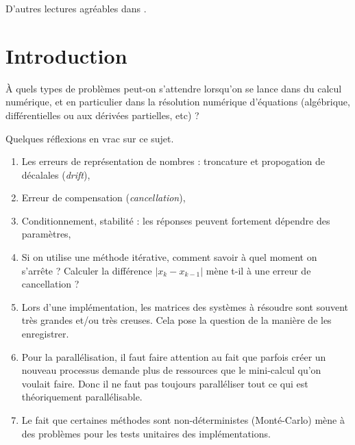 
D'autres lectures agréables dans \cite{GianlucaB}.

\section{Introduction}

À quels types de problèmes peut-on s'attendre lorsqu'on se lance dans du calcul numérique, et en particulier dans la résolution numérique d'équations (algébrique, différentielles ou aux dérivées partielles, etc) ?

Quelques réflexions en vrac sur ce sujet.

\begin{enumerate}
    \item
        Les erreurs de représentation de nombres : troncature et propogation de décalales (\emph{drift}),
    \item
        Erreur de compensation (\emph{cancellation}),
    \item
        Conditionnement, stabilité : les réponses peuvent fortement dépendre des paramètres,
    \item
        Si on utilise une méthode itérative, comment savoir à quel moment on s'arrête ? Calculer la différence \( | x_k-x_{k-1} |\) mène t-il à une erreur de cancellation ?
    \item
        Lors d'une implémentation, les matrices des systèmes à résoudre sont souvent très grandes et/ou très creuses. Cela pose la question de la manière de les enregistrer.
    \item
        Pour la parallélisation, il faut faire attention au fait que parfois créer un nouveau processus demande plus de ressources que le mini-calcul qu'on voulait faire. Donc il ne faut pas toujours paralléliser tout ce qui est théoriquement parallélisable.
    \item
        Le fait que certaines méthodes sont non-déterministes (Monté-Carlo) mène à des problèmes pour les tests unitaires des implémentations.
\end{enumerate}

